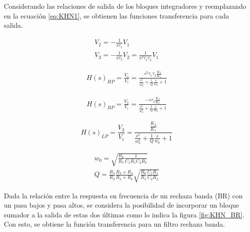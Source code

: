 Considerando las relaciones de salida de los bloques integradores y reemplazando en la ecuación \ref{eq:KHN1}, se obtienen las funciones transferencia para cada salida.

\begin{equation}
\begin{matrix}
        V_{2} = -\frac{1}{s\tau_{1}}V_{1}\\
        V_{3} = -\frac{1}{s\tau_{2}}V_{2} = \frac{1}{s^{2}\tau_{1}\tau_{2}}V_{1}
\end{matrix}
    \label{eq:KHN3}
\end{equation}

\begin{equation}
    \begin{split}
        H(s)_{HP} = \frac{V_{1}}{V_{i}} = \frac{s^{2} \tau_{1}\tau_{2} \frac{K_{2}}{K_{1}}}{\frac{s^{2}}{w_{0}^{2}} + \frac{1}{Q} \frac{s}{w_{0}} + 1}
    \end{split}
    \label{eq:KHN4}
\end{equation}

\begin{equation}
    \begin{split}
        H(s)_{BP} = \frac{V_{2}}{V_{i}} = \frac{-s \tau_{2} \frac{K_{2}}{K_{1}}}{\frac{s^{2}}{w_{0}^{2}} + \frac{1}{Q} \frac{s}{w_{0}} + 1}
    \end{split}
    \label{eq:KHN5}
\end{equation}

\begin{equation}
        H(s)_{LP} = \frac{V_{3}}{V_{i}} = \frac{\frac{K_{2}}{K_{1}}}{\frac{s^{2}}{w_{0}^{2}} + \frac{1}{Q} \frac{s}{w_{0}} + 1}
    \label{eq:KHN6}
\end{equation}


\begin{equation}
    \begin{matrix}
            
        w_{0} = \sqrt{\frac{R_{6}}{R_{5}} \frac{1}{C_{1}R_{1}C_{2}R_{2}}}\\

        Q = \frac{R_{5}}{R_{3}}\frac{R_{3} + R_{4}}{R_{5}+R_{6}}\sqrt{\frac{R_{6}}{R_{5}} \frac{C_{1}R_{1}}{C_{2}R_{2}}}
    \end{matrix}
    \label{eq:KHN7}
\end{equation}


Dada la relación entre la respuesta en frecuencia de un rechaza banda (BR) con un pasa bajos y pasa altos, se considera la posibilidad de incorporar un bloque sumador a la salida de estas dos últimas como lo indica la figura \ref{fig:KHN_BR}. Con esto, se obtiene la función transferencia para un filtro rechaza banda. 


